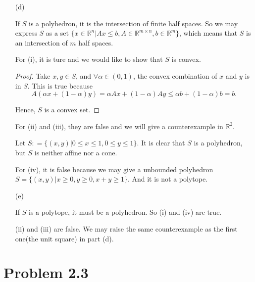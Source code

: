 \documentclass[12pt]{article}
\begin{document}
\begin{enumerate}
\vspace{50mm}

\item [(d)]

If $S$ is a polyhedron, it is the intersection of finite half spaces. So we may express $S$ as a set $\{x\in \mathbb{R}^n | Ax \leqslant b, A\in \mathbb{R}^{m\times n}, b\in\mathbb{R}^m \}$, which means that $S$ is an intersection of $m$ half spaces.

For (i), it is ture and we would like to show that $S$ is convex.
\begin{proof}

Take $x, y \in S$, and $\forall \alpha \in (0, 1)$, the convex combination of $x$ and $y$ is in $S$. This is true because 
$$
A(\alpha x + (1- \alpha) y) = \alpha Ax + (1-\alpha)Ay \leqslant \alpha b + (1-\alpha) b = b.
$$

Hence, $S$ is a convex set.

\end{proof}

For (ii) and (iii), they are false and we will give a counterexample in $\mathbb{R}^2$.

Let $S : = \{(x, y) | 0\leqslant x \leqslant 1, 0\leqslant y \leqslant 1 \}$. It is clear that $S$ is a polyhedron, but $S$ is neither affine nor a cone.

\vspace{50mm}

For (iv), it is false because we may give a unbounded polyhedron $S = \{(x, y) | x\geqslant 0, y\geqslant 0, x+y \geqslant 1\}$. And it is not a polytope.

\vspace{50mm}



\item[(e)]

If $S$ is a polytope, it must be a polyhedron. So (i) and (iv) are true. 

(ii) and (iii) are false. We may raise the same counterexample as the first one(the unit square) in part (d).





\end{enumerate}


\section*{Problem 2.3}
\end{document}
